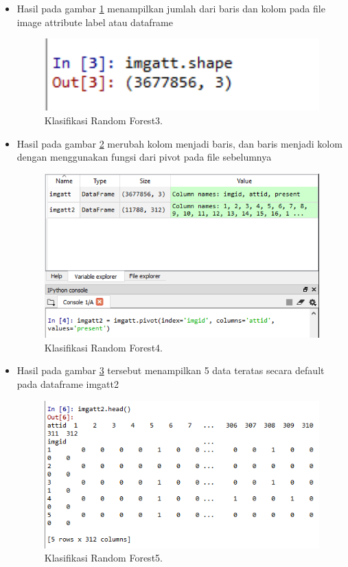 \begin{enumerate}
\begin{itemize}
\item Hasil pada gambar \ref{rons3} menampilkan jumlah dari baris dan kolom pada file image attribute label atau dataframe
 		\begin{figure}[ht]
		\centerline{\includegraphics[width=1\textwidth]{figures/im/rons3.png}}
		\caption{Klasifikasi Random Forest3.}
		\label{rons3}
		\end{figure}

\item Hasil pada gambar \ref{rons4} merubah kolom menjadi baris, dan baris menjadi kolom dengan menggunakan fungsi dari pivot pada file sebelumnya
 		\begin{figure}[ht]
		\centerline{\includegraphics[width=1\textwidth]{figures/im/rons4.png}}
		\caption{Klasifikasi Random Forest4.}
		\label{rons4}
		\end{figure}

\item Hasil pada gambar \ref{rons5} tersebut menampilkan 5 data teratas secara default pada dataframe imgatt2
 		\begin{figure}[ht]
		\centerline{\includegraphics[width=1\textwidth]{figures/im/rons5.png}}
		\caption{Klasifikasi Random Forest5.}
		\label{rons5}
		\end{figure}


\end{itemize}
\end{enumerate}
